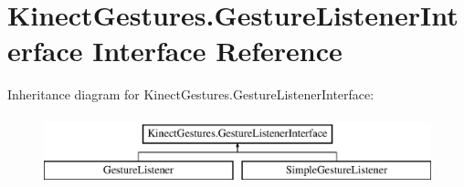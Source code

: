 \hypertarget{interface_kinect_gestures_1_1_gesture_listener_interface}{}\section{Kinect\+Gestures.\+Gesture\+Listener\+Interface Interface Reference}
\label{interface_kinect_gestures_1_1_gesture_listener_interface}
Inheritance diagram for Kinect\+Gestures.\+Gesture\+Listener\+Interface\+:\begin{figure}[H]
\begin{center}
\leavevmode
\includegraphics[height=2.000000cm]{interface_kinect_gestures_1_1_gesture_listener_interface}
\end{center}
\end{figure}
